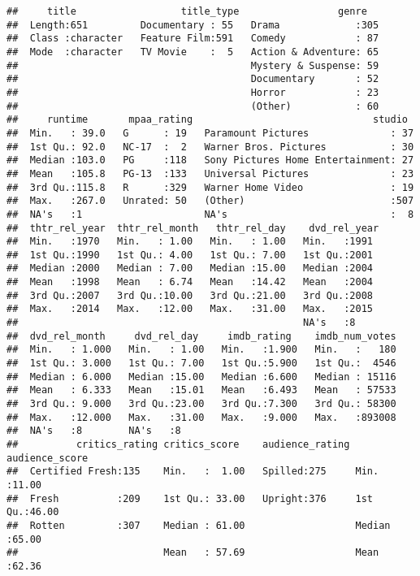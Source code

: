 \documentclass[]{article}
\begin{document}
\begin{verbatim}
##     title                  title_type                 genre    
##  Length:651         Documentary : 55   Drama             :305  
##  Class :character   Feature Film:591   Comedy            : 87  
##  Mode  :character   TV Movie    :  5   Action & Adventure: 65  
##                                        Mystery & Suspense: 59  
##                                        Documentary       : 52  
##                                        Horror            : 23  
##                                        (Other)           : 60  
##     runtime       mpaa_rating                               studio   
##  Min.   : 39.0   G      : 19   Paramount Pictures              : 37  
##  1st Qu.: 92.0   NC-17  :  2   Warner Bros. Pictures           : 30  
##  Median :103.0   PG     :118   Sony Pictures Home Entertainment: 27  
##  Mean   :105.8   PG-13  :133   Universal Pictures              : 23  
##  3rd Qu.:115.8   R      :329   Warner Home Video               : 19  
##  Max.   :267.0   Unrated: 50   (Other)                         :507  
##  NA's   :1                     NA's                            :  8  
##  thtr_rel_year  thtr_rel_month   thtr_rel_day    dvd_rel_year 
##  Min.   :1970   Min.   : 1.00   Min.   : 1.00   Min.   :1991  
##  1st Qu.:1990   1st Qu.: 4.00   1st Qu.: 7.00   1st Qu.:2001  
##  Median :2000   Median : 7.00   Median :15.00   Median :2004  
##  Mean   :1998   Mean   : 6.74   Mean   :14.42   Mean   :2004  
##  3rd Qu.:2007   3rd Qu.:10.00   3rd Qu.:21.00   3rd Qu.:2008  
##  Max.   :2014   Max.   :12.00   Max.   :31.00   Max.   :2015  
##                                                 NA's   :8     
##  dvd_rel_month     dvd_rel_day     imdb_rating    imdb_num_votes  
##  Min.   : 1.000   Min.   : 1.00   Min.   :1.900   Min.   :   180  
##  1st Qu.: 3.000   1st Qu.: 7.00   1st Qu.:5.900   1st Qu.:  4546  
##  Median : 6.000   Median :15.00   Median :6.600   Median : 15116  
##  Mean   : 6.333   Mean   :15.01   Mean   :6.493   Mean   : 57533  
##  3rd Qu.: 9.000   3rd Qu.:23.00   3rd Qu.:7.300   3rd Qu.: 58300  
##  Max.   :12.000   Max.   :31.00   Max.   :9.000   Max.   :893008  
##  NA's   :8        NA's   :8                                       
##          critics_rating critics_score    audience_rating audience_score 
##  Certified Fresh:135    Min.   :  1.00   Spilled:275     Min.   :11.00  
##  Fresh          :209    1st Qu.: 33.00   Upright:376     1st Qu.:46.00  
##  Rotten         :307    Median : 61.00                   Median :65.00  
##                         Mean   : 57.69                   Mean   :62.36  

\end{verbatim}
\end{document}
